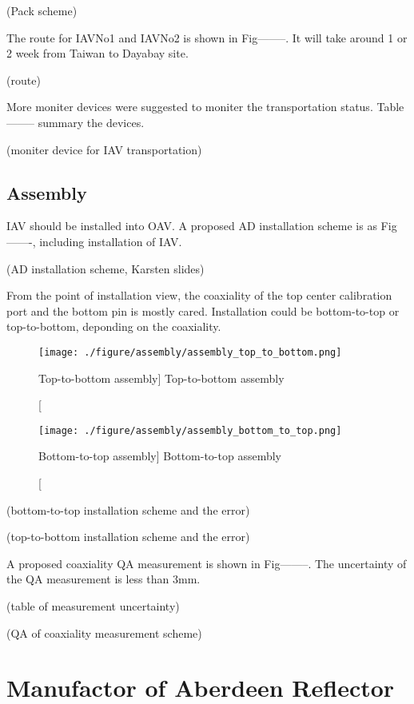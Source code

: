 (Pack scheme)


The route for IAVNo1 and IAVNo2 is shown in Fig--------.
It will take around 1 or 2 week from Taiwan to Dayabay site.


(route)


More moniter devices were suggested to moniter the transportation
status. Table-------- summary the devices.


(moniter device for IAV transportation)


\subsection {Assembly}
\label {sec:assembly}

IAV should be installed into OAV. A proposed AD installation
scheme is as Fig-------, including installation of IAV.


(AD installation scheme, Karsten slides)


From the point of installation view, the coaxiality of the top center calibration port and
the bottom pin is mostly cared. Installation could be bottom-to-top or top-to-bottom, deponding
on the coaxiality.







\begin{figure}
    \centering
    \texttt{[image: ./figure/assembly/assembly\_top\_to\_bottom.png]}
    \caption
    [Top-to-bottom assembly]
    {Top-to-bottom assembly}
    \label{fig:assembly_top_to_bottom.png}
    \end{figure}


\begin{figure}
    \centering
    \texttt{[image: ./figure/assembly/assembly\_bottom\_to\_top.png]}
    \caption
    [Bottom-to-top assembly]
    {Bottom-to-top assembly}
    \label{fig:assembly_bottom_to_top.png}
    \end{figure}









(bottom-to-top installation scheme and the error)




(top-to-bottom installation scheme and the error)



A proposed coaxiality QA measurement is shown in Fig--------. The uncertainty
of the QA measurement is less than 3mm.


(table of measurement uncertainty)





(QA of coaxiality measurement scheme)







\section {Manufactor of Aberdeen Reflector}
\label{sec:reflector}

